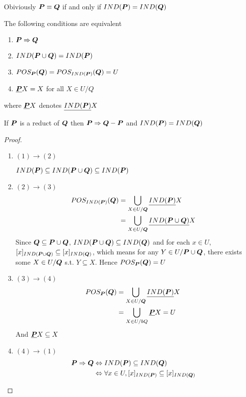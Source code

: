 \documentclass[11pt]{article}
\begin{document}
Obiviously \(\boldsymbol{P}\equiv\boldsymbol{Q}\) if and only if \(IND(\boldsymbol{P})=IND(\boldsymbol{Q})\)


\begin{proposition}[4.1]
The following conditions are equivalent
\begin{enumerate}
\item \(\boldsymbol{P}\Rightarrow\boldsymbol{Q}\)
\item \(IND(\boldsymbol{P}\cup\boldsymbol{Q})=IND(\boldsymbol{P})\)
\item \(POS_{\boldsymbol{P}}(\boldsymbol{Q})=POS_{IND(\boldsymbol{P})}(\boldsymbol{Q})=U\)
\item \(\underline{\boldsymbol{P}} X=X\) for all \(X\in U/Q\)
\end{enumerate}


where \(\underline{\boldsymbol{P}} X\) denotes \(\underline{IND(\boldsymbol{P})} X\)
\end{proposition}
\begin{proposition}[4.2]
If \(\boldsymbol{P}\) is a reduct of \(\boldsymbol{Q}\) then \(\boldsymbol{P}\Rightarrow \boldsymbol{Q}-\boldsymbol{P}\) and \(IND(\boldsymbol{P})=IND(\boldsymbol{Q})\)
\end{proposition}

\begin{proof}
\begin{enumerate}
\item \((1)\to (2)\)

\(IND(\boldsymbol{P})\subseteq IND(\boldsymbol{P}\cup \boldsymbol{Q})\subseteq IND(\boldsymbol{P})\)
\item \((2)\to (3)\)
\begin{align*}
POS_{IND(\boldsymbol{P})}(\boldsymbol{Q})&=\displaystyle\bigcup_{X\in U/\boldsymbol{Q}} 
\underline{IND(\boldsymbol{P})} X\\
&=\displaystyle\bigcup_{X\in U/\boldsymbol{Q}} \underline{IND(\boldsymbol{P}\cup \boldsymbol{Q})} X
\end{align*}
Since \(\boldsymbol{Q}\subseteq \boldsymbol{P}\cup\boldsymbol{Q}\), \(IND(\boldsymbol{P}\cup\boldsymbol{Q})\subseteq IND(\boldsymbol{Q})\) and
for each \(x\in U\), \([x]_{IND(\boldsymbol{P}\cup\boldsymbol{Q})}\subseteq [x]_{IND(\boldsymbol{Q})}\), which
means for any \(Y\in U/\boldsymbol{P}\cup\boldsymbol{Q}\), there exists some \(X\in U/\boldsymbol{Q}\) s.t.
\(Y\subseteq X\). Hence \(POS_{\boldsymbol{P}}(\boldsymbol{Q})=U\)
\item \((3)\to(4)\)
\begin{align*}
POS_{\boldsymbol{P}}(\boldsymbol{Q})&=\displaystyle\bigcup_{X\in U/\boldsymbol{Q}}\underline{IND(\boldsymbol{P})} X\\
&=\displaystyle\bigcup_{X\in U/bQ}\underline{\boldsymbol{P}} X=U\\
\end{align*}
And \(\underline{\boldsymbol{P}} X\subseteq X\)
\item \((4)\to (1)\)
\begin{align*}
\boldsymbol{P}\Rightarrow\boldsymbol{Q}&\Leftrightarrow IND(\boldsymbol{P})\subseteq IND(\boldsymbol{Q})\\
&\Leftrightarrow \forall x\in U, [x]_{IND(\boldsymbol{P})}\subseteq [x]_{IND(\boldsymbol{Q})}\\
\end{align*}
\end{enumerate}
\end{proof}
\end{document}

